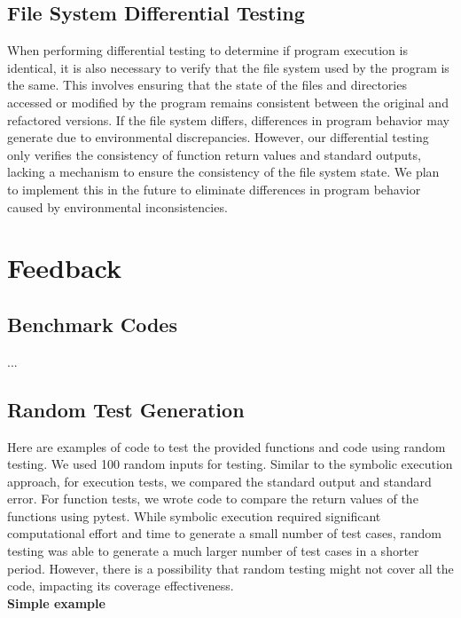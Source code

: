 \documentclass[11pt]{article}
\begin{document}
\subsection{File System Differential Testing}
When performing differential testing to determine if program execution is identical, it is also necessary to verify that the file system used by the program is the same. This involves ensuring that the state of the files and directories accessed or modified by the program remains consistent between the original and refactored versions. If the file system differs, differences in program behavior may generate due to environmental discrepancies. However, our differential testing only verifies the consistency of function return values and standard outputs, lacking a mechanism to ensure the consistency of the file system state. We plan to implement this in the future to eliminate differences in program behavior caused by environmental inconsistencies.

\section{Feedback}
\subsection{Benchmark Codes}
...\\

\subsection{Random Test Generation}
Here are examples of code to test the provided functions and code using random testing. We used 100 random inputs for testing. Similar to the symbolic execution approach, for execution tests, we compared the standard output and standard error. For function tests, we wrote code to compare the return values of the functions using pytest. While symbolic execution required significant computational effort and time to generate a small number of test cases, random testing was able to generate a much larger number of test cases in a shorter period. However, there is a possibility that random testing might not cover all the code, impacting its coverage effectiveness. \\

\textbf{Simple example}
\end{document}
